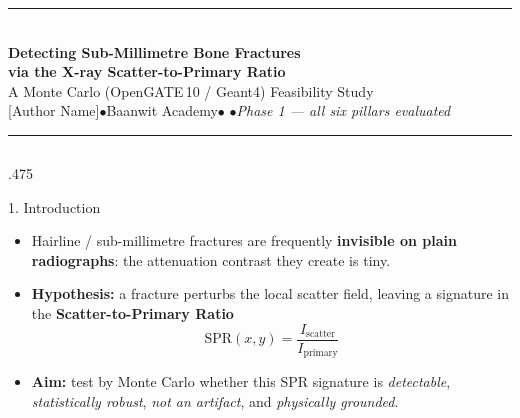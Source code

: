 \documentclass[final]{beamer}
\begin{document}
\begin{frame}[t]

\begin{center}
{\color{theme}\rule{\linewidth}{3pt}}\\[0.4ex]
{\veryHuge\bfseries\color{themeD} Detecting Sub-Millimetre Bone Fractures}\\[0.4ex]
{\Huge\bfseries\color{theme} via the X-ray Scatter-to-Primary Ratio}\\[0.6ex]
{\Large A Monte Carlo (OpenGATE\,10 / Geant4) Feasibility Study}\\[0.5ex]
{\large [Author Name]\quad$\bullet$\quad Baanwit Academy\quad$\bullet$ \quad$\bullet$\quad \textit{Phase 1 --- all six pillars evaluated}}\\[0.3ex]
{\color{theme}\rule{\linewidth}{3pt}}
\end{center}
\vspace{0.4ex}

\begin{columns}[t]

\begin{column}{.475\textwidth}

\begin{block}{1. Introduction}
\begin{itemize}
  \item Hairline / sub-millimetre fractures are frequently \textbf{invisible on plain radiographs}: the attenuation contrast they create is tiny.
  \item \textbf{Hypothesis:} a fracture perturbs the local scatter field, leaving a signature in the \textbf{Scatter-to-Primary Ratio}
  \[ \mathrm{SPR}(x,y)=\frac{I_{\text{scatter}}}{I_{\text{primary}}} \]
  \item \textbf{Aim:} test by Monte Carlo whether this SPR signature is \emph{detectable}, \emph{statistically robust}, \emph{not an artifact}, and \emph{physically grounded}.
\end{itemize}
\end{block}


\end{column}
\end{columns}
\end{frame}
\end{document}
